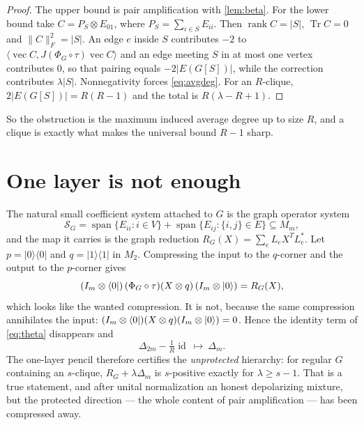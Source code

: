 \documentclass[11pt,reqno]{amsart}
\theoremstyle{plain}
\theoremstyle{remark}
\DeclareMathOperator{\Tr}{Tr}
\DeclareMathOperator{\rank}{rank}
\DeclareMathOperator{\id}{id}
\DeclareMathOperator{\vecop}{vec}
\newcommand{\cS}{\mathcal S}
\newcommand{\ketbra}[2]{\lvert #1\rangle\!\langle #2\rvert}
\newcommand{\ip}[2]{\langle #1,#2\rangle}
\newcommand{\norm}[1]{\lVert #1\rVert}
\newcommand{\abs}[1]{\lvert #1\rvert}
\begin{document}
\begin{proof}
The upper bound is pair amplification with \cref{lem:beta}.  For the lower
bound take $C=P_S\otimes E_{01}$, where $P_S=\sum_{i\in S}E_{ii}$.  Then
$\rank C=\abs S$, $\Tr C=0$ and $\norm C_F^2=\abs S$.  An edge $e$ inside $S$
contributes $-2$ to $\ip{\vecop C}{J(\Phi_G\circ\tau)\vecop C}$ and an edge
meeting $S$ in at most one vertex contributes $0$, so that pairing equals
$-2\abs{E(G[S])}$, while the correction contributes $\lambda\abs S$.
Nonnegativity forces \cref{eq:avgdeg}.  For an $R$-clique,
$2\abs{E(G[S])}=R(R-1)$ and the total is $R(\lambda-R+1)$.
\end{proof}

So the obstruction is the maximum induced average degree up to size $R$, and a
clique is exactly what makes the universal bound $R-1$ sharp.

\section{One layer is not enough}

The natural small coefficient system attached to $G$ is the graph operator
system
\begin{equation}
\label{eq:sg}
    \cS_G=\operatorname{span}\{E_{ii}:i\in V\}
      +\operatorname{span}\{E_{ij}:\{i,j\}\in E\}\subseteq M_m,
\end{equation}
and the map it carries is the graph reduction
$R_G(X)=\sum_eL_eX^TL_e^*$.  Let $p=\ketbra00$ and $q=\ketbra11$ in $M_2$.
Compressing the input to the $q$-corner and the output to the $p$-corner gives
\begin{equation}
\label{eq:corner}
    (I_m\otimes\bra0)\,(\Phi_G\circ\tau)(X\otimes q)\,(I_m\otimes\ket0)=R_G(X),
\end{equation}
which looks like the wanted compression.  It is not, because the same
compression annihilates the input:
$(I_m\otimes\bra0)(X\otimes q)(I_m\otimes\ket0)=0$.  Hence the identity term of
\cref{eq:theta} disappears and
\begin{equation}
\label{eq:corner-loss}
    \Delta_{2m}-\tfrac1R\id\ \longmapsto\ \Delta_m .
\end{equation}
The one-layer pencil therefore certifies the \emph{unprotected} hierarchy: for
regular $G$ containing an $s$-clique, $R_G+\lambda\Delta_m$ is $s$-positive
exactly for $\lambda\ge s-1$.  That is a true statement, and after unital
normalization an honest depolarizing mixture, but the protected direction --- the
whole content of pair amplification --- has been compressed away.
\end{document}
